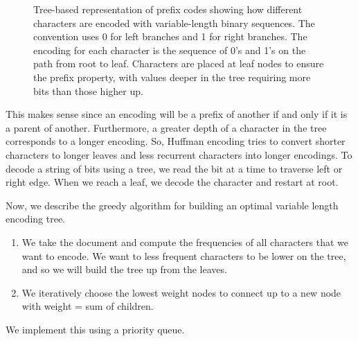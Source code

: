 \begin{figure}[H]
    \caption{Tree-based representation of prefix codes showing how different characters are encoded with variable-length binary sequences. The convention uses 0 for left branches and 1 for right branches. The encoding for each character is the sequence of 0's and 1's on the path from root to leaf. Characters are placed at leaf nodes to ensure the prefix property, with values deeper in the tree requiring more bits than those higher up.}
    \label{fig:prefix-tree}
  \end{figure}

  This makes sense since an encoding will be a prefix of another if and only if it is a parent of another. Furthermore, a greater depth of a character in the tree corresponds to a longer encoding. So, Huffman encoding tries to convert shorter characters to longer leaves and less recurrent characters into longer encodings. To decode a string of bits using a tree, we read the bit at a time to traverse left or right edge. When we reach a leaf, we decode the character and restart at root. 

  Now, we describe the greedy algorithm for building an optimal variable length encoding tree. 
  \begin{enumerate}
      \item We take the document and compute the frequencies of all characters that we want to encode. We want to less frequent characters to be lower on the tree, and so we will build the tree up from the leaves. 
      \item We iteratively choose the lowest weight nodes to connect up to a new node with weight = sum of children. 
  \end{enumerate}
  We implement this using a priority queue. 

